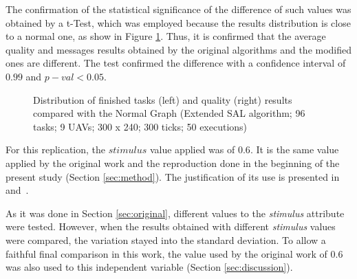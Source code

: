 The confirmation of the statistical significance of the difference of such values was obtained by a t-Test, which was employed because the results distribution is close to a normal one, as show in Figure \ref{fig:fig07}. Thus, it is confirmed that the average quality and messages results obtained by the original algorithms and the modified ones are different. The test confirmed the difference with a confidence interval of $0.99$ and $p-val<0.05$. 

\begin{figure}[!htb]
\centering
{}
\quad
{}
\caption{Distribution of finished tasks (left) and quality (right) results compared with the Normal Graph (Extended SAL algorithm; 96 tasks; 9 UAVs; 300 x 240; 300 ticks; 50 executions)}
\label{fig:fig07}
\end{figure}

For this replication, the $stimulus$ value applied was of $0.6$. It is the same value applied by the original work and the reproduction done in the beginning of the present study (Section \ref{sec:method}). The justification of its use is presented in~\cite{MAS07} and~\cite{ferreira2007swarm}.

As it was done in Section \ref{sec:original}, different values to the \textit{stimulus} attribute were tested. However, when the results obtained with different \textit{stimulus} values were compared, the variation stayed into the standard deviation. To allow a faithful final comparison in this work, the value used by the original work \cite{MAS07} of $0.6$ was also used to this independent variable (Section \ref{sec:discussion}).
